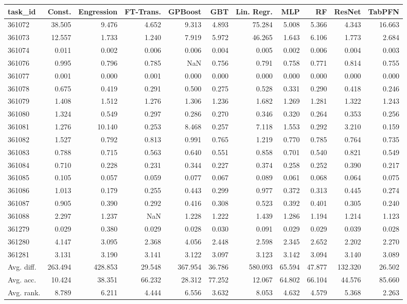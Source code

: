 \begin{tabular}{lrrrrrrrrrr}
\toprule
task\_id & Const. & Engression & FT-Trans. & GPBoost & GBT & Lin. Regr. & MLP & RF & ResNet & TabPFN \\
\midrule
361072 & 38.505 & 9.476 & 4.652 & 9.313 & 4.893 & 75.284 & 5.008 & 5.366 & 4.343 & 16.663 \\
361073 & 12.557 & 1.733 & 1.240 & 7.919 & 5.972 & 46.265 & 1.643 & 6.106 & 1.773 & 2.684 \\
361074 & 0.011 & 0.002 & 0.006 & 0.006 & 0.004 & 0.005 & 0.002 & 0.006 & 0.004 & 0.003 \\
361076 & 0.995 & 0.796 & 0.785 & NaN & 0.756 & 0.791 & 0.758 & 0.771 & 0.814 & 0.755 \\
361077 & 0.001 & 0.000 & 0.001 & 0.000 & 0.000 & 0.000 & 0.000 & 0.000 & 0.000 & 0.000 \\
361078 & 0.675 & 0.419 & 0.291 & 0.500 & 0.275 & 0.528 & 0.331 & 0.290 & 0.418 & 0.246 \\
361079 & 1.408 & 1.512 & 1.276 & 1.306 & 1.236 & 1.682 & 1.269 & 1.281 & 1.322 & 1.243 \\
361080 & 1.324 & 0.549 & 0.297 & 0.286 & 0.270 & 0.346 & 0.320 & 0.264 & 0.353 & 0.256 \\
361081 & 1.276 & 10.140 & 0.253 & 8.468 & 0.257 & 7.118 & 1.553 & 0.292 & 3.210 & 0.159 \\
361082 & 1.527 & 0.792 & 0.813 & 0.991 & 0.765 & 1.219 & 0.770 & 0.785 & 0.764 & 0.735 \\
361083 & 0.788 & 0.715 & 0.563 & 0.640 & 0.551 & 0.858 & 0.701 & 0.540 & 0.821 & 0.549 \\
361084 & 0.710 & 0.228 & 0.231 & 0.344 & 0.227 & 0.374 & 0.258 & 0.252 & 0.390 & 0.217 \\
361085 & 0.105 & 0.057 & 0.059 & 0.077 & 0.067 & 0.089 & 0.061 & 0.068 & 0.064 & 0.075 \\
361086 & 1.013 & 0.179 & 0.255 & 0.443 & 0.299 & 0.977 & 0.372 & 0.313 & 0.445 & 0.274 \\
361087 & 0.905 & 0.390 & 0.292 & 0.416 & 0.308 & 0.523 & 0.392 & 0.401 & 0.305 & 0.240 \\
361088 & 2.297 & 1.237 & NaN & 1.228 & 1.222 & 1.439 & 1.286 & 1.194 & 1.214 & 1.123 \\
361279 & 0.029 & 0.380 & 0.029 & 0.028 & 0.030 & 0.091 & 0.029 & 0.029 & 0.039 & 0.028 \\
361280 & 4.147 & 3.095 & 2.368 & 4.056 & 2.448 & 2.598 & 2.345 & 2.652 & 2.202 & 2.270 \\
361281 & 3.131 & 3.190 & 3.141 & 3.122 & 3.097 & 3.123 & 3.142 & 3.094 & 3.140 & 3.089 \\
Avg. diff. & 263.494 & 428.853 & 29.548 & 367.954 & 36.786 & 580.093 & 65.594 & 47.877 & 132.320 & 26.502 \\
Avg. acc. & 10.424 & 38.351 & 66.232 & 28.312 & 77.252 & 12.067 & 64.802 & 66.104 & 44.576 & 85.660 \\
Avg. rank. & 8.789 & 6.211 & 4.444 & 6.556 & 3.632 & 8.053 & 4.632 & 4.579 & 5.368 & 2.263 \\
\bottomrule
\end{tabular}
